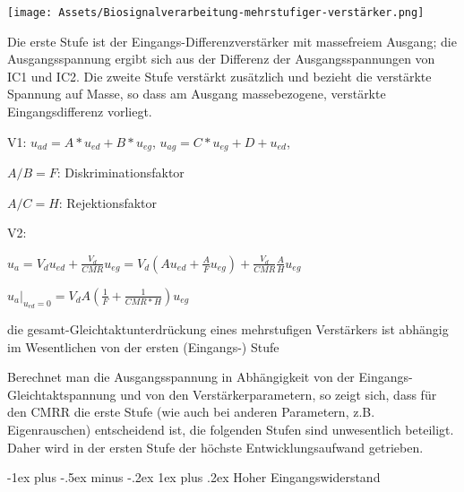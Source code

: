 \documentclass[a4paper]{article}
\makeatletter
\renewcommand{\subsubsection}{\@startsection{subsubsection}{3}{0mm}%
 {-1ex plus -.5ex minus -.2ex}%
 {1ex plus .2ex}%
 {\normalfont\small\bfseries}}
\makeatother
\begin{document}
\begin{multicols}{3}
  \begin{itemize*}
    \item \texttt{[image: Assets/Biosignalverarbeitung-mehrstufiger-verstärker.png]}
    \item Die erste Stufe ist der Eingangs-Differenzverstärker mit massefreiem Ausgang; die Ausgangsspannung ergibt sich aus der Differenz der Ausgangsspannungen von IC1 und IC2. Die zweite Stufe verstärkt zusätzlich und bezieht die verstärkte Spannung auf Masse, so dass am Ausgang massebezogene, verstärkte Eingangsdifferenz vorliegt.
    \item V1: $u_{ad}=A*u_{ed}+B*u_{eg}$, $u_{ag}=C*u_{eg}+D+u_{ed}$,
    \begin{itemize*}
      \item $A/B=F$: Diskriminationsfaktor
      \item $A/C=H$: Rejektionsfaktor
    \end{itemize*}
    \item V2:
    \begin{itemize*}
      \item $u_a=V_d u_{ed}+\frac{V_d}{CMR}u_{eg}=V_d(A u_{ed}+\frac{A}{F} u_{eg})+\frac{V_d}{CMR}\frac{A}{H} u_{eg}$
      \item $u_a|_{u_{ed}=0} = V_d A(\frac{1}{F}+\frac{1}{CMR*H}) u_{eg}$
      \item die gesamt-Gleichtaktunterdrückung eines mehrstufigen Verstärkers ist abhängig im Wesentlichen von der ersten (Eingangs-) Stufe
    \end{itemize*}
    \item Berechnet man die Ausgangsspannung in Abhängigkeit von der Eingangs-Gleichtaktspannung und von den Verstärkerparametern, so zeigt sich, dass für den CMRR die erste Stufe (wie auch bei anderen Parametern, z.B. Eigenrauschen) entscheidend ist, die folgenden Stufen sind unwesentlich beteiligt. Daher wird in der ersten Stufe der höchste Entwicklungsaufwand getrieben.
  \end{itemize*}

  \subsubsection{Hoher Eingangswiderstand}\label{hoher-eingangswiderstand}


\end{multicols}
\end{document}
